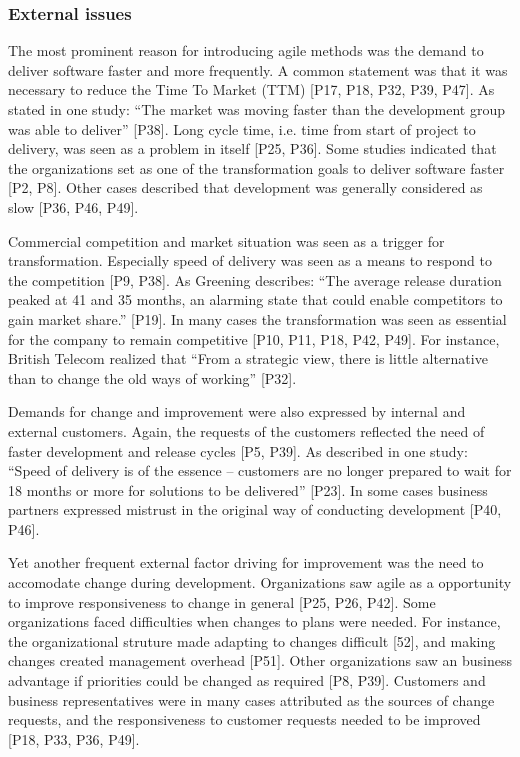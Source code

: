 \documentclass[preprint,authoryear,12pt]{elsarticle}
\begin{document}
\subsubsection{External issues}

The most prominent reason for introducing agile methods was the demand to
deliver software faster and more frequently. A common statement was that it was
necessary to reduce the Time To Market (TTM) [P17, P18, P32, P39, P47]. As
stated in one study: ``The market was moving faster than the development group
was able to deliver'' [P38]. Long cycle time, i.e. time from start of project to
delivery, was seen as a problem in itself [P25, P36]. Some studies indicated
that the organizations set as one of the transformation goals to deliver
software faster [P2, P8]. Other cases described that development was generally
considered as slow [P36, P46, P49].

Commercial competition and market situation was seen as a trigger for
transformation. Especially speed of delivery was seen as a means to respond to
the competition [P9, P38]. As Greening describes: ``The average release duration
peaked at 41 and 35 months, an alarming state that could enable competitors to
gain market share.'' [P19]. In many cases the transformation was seen as
essential for the company to remain competitive [P10, P11, P18, P42, P49]. For
instance, British Telecom realized that ``From a strategic view, there is little
alternative than to change the old ways of working'' [P32].

Demands for change and improvement were also expressed by internal and external
customers. Again, the requests of the customers reflected the need of faster
development and release cycles [P5, P39]. As described in one study: ``Speed of
delivery is of the essence – customers are no longer prepared to wait for 18
months or more for solutions to be delivered'' [P23]. In some cases business
partners expressed mistrust in the original way of conducting development [P40,
P46].

Yet another frequent external factor driving for improvement was the need to
accomodate change during development. Organizations saw agile as a opportunity
to improve responsiveness to change in general [P25, P26, P42].
Some organizations faced difficulties when changes to plans were needed. For
instance, the organizational struture made adapting to changes difficult [52],
and making changes created management overhead [P51]. Other organizations saw an
business advantage if priorities could be changed as required [P8, P39].
Customers and business representatives were in many cases attributed as the
sources of change requests, and the responsiveness to customer requests needed
to be improved [P18, P33, P36, P49].
\end{document}
